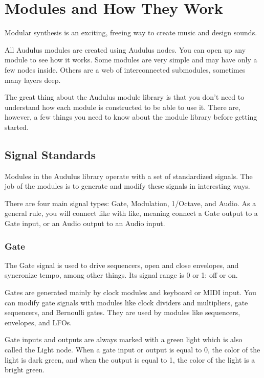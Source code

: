 \documentclass[11pt]{book}
\begin{document}
\chapter{Modules and How They Work}

Modular synthesis is an exciting, freeing way to create music and design sounds.

All Audulus modules are created using Audulus nodes. You can open up any module to see how it works. Some modules are very simple and may have only a few nodes inside. Others are a web of interconnected submodules, sometimes many layers deep.

The great thing about the Audulus module library is that you don't need to understand how each module is constructed to be able to use it. There are, however, a few things you need to know about the module library before getting started.

\section{Signal Standards}

Modules in the Audulus library operate with a set of standardized signals. The job of the modules is to generate and modify these signals in interesting ways.

There are four main signal types: Gate, Modulation, 1/Octave, and Audio. As a general rule, you will connect like with like, meaning connect a Gate output to a Gate input, or an Audio output to an Audio input.

\subsection{Gate}

The Gate signal is used to drive sequencers, open and close envelopes, and syncronize tempo, among other things. Its signal range is 0 or 1: off or on.

Gates are generated mainly by clock modules and keyboard or MIDI input. You can modify gate signals with modules like clock dividers and multipliers, gate sequencers, and Bernoulli gates. They are used by modules like sequencers, envelopes, and LFOs.

Gate inputs and outputs are always marked with a green light which is also called the Light node. When a gate input or output is equal to 0, the color of the light is dark green, and when the output is equal to 1, the color of the light is a bright green.
\end{document}
